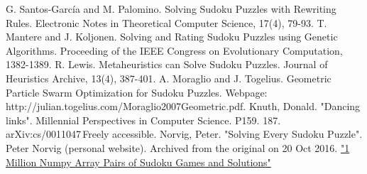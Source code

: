 \documentclass[12pt]{article}
\begin{document}
\begin{spacing}{1.1}
\clearpage

\begin{thebibliography}{}
	 G. Santos-García and M. Palomino. Solving Sudoku Puzzles with Rewriting Rules. Electronic Notes in Theoretical Computer Science, 17(4), 79-93.
	T. Mantere and J. Koljonen. Solving and Rating Sudoku Puzzles using Genetic Algorithms. Proceeding of the IEEE Congress on Evolutionary Computation, 1382-1389.
	R. Lewis. Metaheuristics can Solve Sudoku Puzzles. Journal of Heuristics Archive, 13(4), 387-401.
	A. Moraglio and J. Togelius. Geometric Particle Swarm Optimization for Sudoku Puzzles. Webpage: http://julian.togelius.com/Moraglio2007Geometric.pdf.
	Knuth, Donald. "Dancing links". Millennial Perspectives in Computer Science. P159. 187. arXiv:cs/0011047 Freely accessible.
	Norvig, Peter. "Solving Every Sudoku Puzzle". Peter Norvig (personal website). Archived from the original on 20 Oct 2016.
	\href{https://www.kaggle.com/bryanpark/sudoku}{"1 Million Numpy Array Pairs of Sudoku Games and Solutions"}
\end{thebibliography}

\end{spacing}
\end{document}
